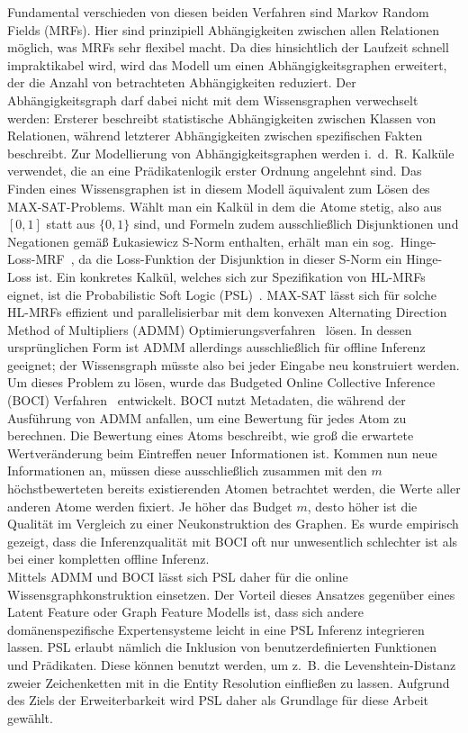 \documentclass[11pt, a4paper]{scrreprt}
\begin{document}
Fundamental verschieden von diesen beiden Verfahren sind Markov Random Fields (MRFs).
Hier sind prinzipiell Abhängigkeiten zwischen allen Relationen möglich, was MRFs sehr flexibel macht.
Da dies hinsichtlich der Laufzeit schnell impraktikabel wird, wird das Modell um einen Abhängigkeitsgraphen erweitert, der die Anzahl von betrachteten Abhängigkeiten reduziert.
Der Abhängigkeitsgraph darf dabei nicht mit dem Wissensgraphen verwechselt werden:
Ersterer beschreibt statistische Abhängigkeiten zwischen Klassen von Relationen, während letzterer Abhängigkeiten zwischen spezifischen Fakten beschreibt.
Zur Modellierung von Abhängigkeitsgraphen werden i.~d.~R. Kalküle verwendet, die an eine Prädikatenlogik erster Ordnung angelehnt sind.
Das Finden eines Wissensgraphen ist in diesem Modell äquivalent zum Lösen des MAX-SAT-Problems.
Wählt man ein Kalkül in dem die Atome stetig, also aus \([0, 1]\) statt aus \( \{0, 1\} \) sind, und Formeln zudem ausschließlich Disjunktionen und Negationen gemäß Łukasiewicz S-Norm enthalten, erhält man ein sog.\ Hinge-Loss-MRF~\cite{bach:2013}\cite{bach:2015}, da die Loss-Funktion der Disjunktion in dieser S-Norm ein Hinge-Loss ist.
Ein konkretes Kalkül, welches sich zur Spezifikation von HL-MRFs eignet, ist die Probabilistic Soft Logic (PSL)~\cite{brocheler:2010}\cite{bach:2015}.
MAX-SAT lässt sich für solche HL-MRFs effizient und parallelisierbar mit dem konvexen Alternating Direction Method of Multipliers (ADMM) Optimierungsverfahren~\cite{boyd:2011} lösen.
In dessen ursprünglichen Form ist ADMM allerdings ausschließlich für offline Inferenz geeignet;
der Wissensgraph müsste also bei jeder Eingabe neu konstruiert werden.
Um dieses Problem zu lösen, wurde das Budgeted Online Collective Inference (BOCI) Verfahren~\cite{pujara:2015} entwickelt.
BOCI nutzt Metadaten, die während der Ausführung von ADMM anfallen, um eine Bewertung für jedes Atom zu berechnen.
Die Bewertung eines Atoms beschreibt, wie groß die erwartete Wertveränderung beim Eintreffen neuer Informationen ist.
Kommen nun neue Informationen an, müssen diese ausschließlich zusammen mit den \(m\) höchstbewerteten bereits existierenden Atomen betrachtet werden, die Werte aller anderen Atome werden fixiert.
Je höher das Budget \(m\), desto höher ist die Qualität im Vergleich zu einer Neukonstruktion des Graphen.
Es wurde empirisch gezeigt, dass die Inferenzqualität mit BOCI oft nur unwesentlich schlechter ist als bei einer kompletten offline Inferenz.\\

Mittels ADMM und BOCI lässt sich PSL daher für die online Wissensgraphkonstruktion einsetzen.
Der Vorteil dieses Ansatzes gegenüber eines Latent Feature oder Graph Feature Modells ist, dass sich andere domänenspezifische Expertensysteme leicht in eine PSL Inferenz integrieren lassen.
PSL erlaubt nämlich die Inklusion von benutzerdefinierten Funktionen und Prädikaten.
Diese können benutzt werden, um z.~B. die Levenshtein-Distanz zweier Zeichenketten mit in die Entity Resolution einfließen zu lassen.
Aufgrund des Ziels der Erweiterbarkeit wird PSL daher als Grundlage für diese Arbeit gewählt.
\end{document}
